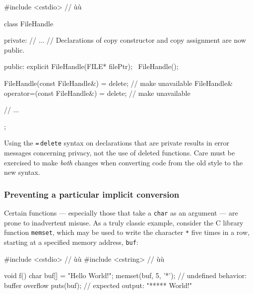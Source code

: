 %
%
%
\begin{emcppshiddenlisting}[emcppsbatch=e1]
#include <cstdio>  // ù{}ù
\end{emcppshiddenlisting}
\begin{emcppslisting}[emcppsbatch=e1]
class FileHandle
{
private:
    // ...
    // Declarations of copy constructor and copy assignment are now public.

public:
    explicit FileHandle(FILE* filePtr);
    ~FileHandle();

    FileHandle(const FileHandle&) = delete;             // make unavailable
    FileHandle& operator=(const FileHandle&) = delete;  // make unavailable

    // ...
};
\end{emcppslisting}

\noindent Using the \lstinline!=!\,\lstinline!delete! syntax on declarations that are private results in error messages concerning privacy, not the use of deleted functions. Care must be exercised to make \emph{both} changes when converting code from the old style to the new syntax.

\subsubsection[Preventing a particular implicit conversion]{Preventing a particular implicit conversion}\label{preventing-a-particular-implicit-conversion}

Certain functions --- especially those that take a \lstinline!char! as an
argument --- are prone to inadvertent misuse. As a truly classic
example, consider the C library function \lstinline!memset!, which may be used
to write the character \lstinline!*! five times in a row, starting at a
specified memory address, \lstinline!buf!:

%
\begin{emcppslisting}
#include <cstdio>  // ù{}ù
#include <cstring> // ù{}ù

void f()
{
    char buf[] = "Hello World!";
    memset(buf, 5, '*');  // undefined behavior: buffer overflow
    puts(buf);            // expected output: "***** World!"
}
\end{emcppslisting}


